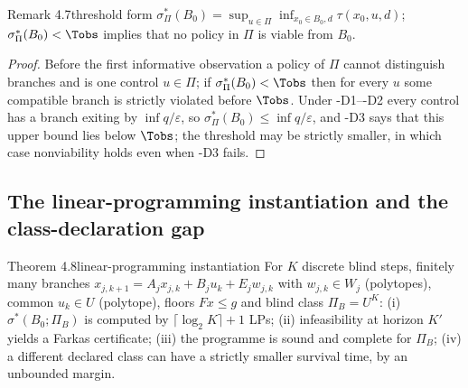 \begin{restated}{Remark 4.7}{threshold form}
$\sigma^*_\Pi(B_0)=\sup_{u\in\Pi}\inf_{x_0\in B_0,d}\tau(x_0,u,d)$; $\sigma^*_\Pi(B_0)<\Tobs$ implies that no policy in $\Pi$ is viable from $B_0$.
\end{restated}

\begin{proof}
Before the first informative observation a policy of $\Pi$ cannot distinguish branches and is one control $u\in\Pi$; if $\sigma^*_\Pi(B_0)<\Tobs$ then for every $u$ some compatible branch is strictly violated before $\Tobs$. Under \hyp{D1}--\hyp{D2} every control has a branch exiting by $\inf q/\varepsilon$, so $\sigma^*_\Pi(B_0)\le\inf q/\varepsilon$, and \hyp{D3} says that this upper bound lies below $\Tobs$; the threshold may be strictly smaller, in which case nonviability holds even when \hyp{D3} fails.
\end{proof}

\subsection{The linear-programming instantiation and the class-declaration gap}\label{S:lp}

\begin{restated}{Theorem 4.8}{linear-programming instantiation}
For $K$ discrete blind steps, finitely many branches $x_{j,k+1}=A_jx_{j,k}+B_ju_k+E_jw_{j,k}$ with $w_{j,k}\in W_j$ (polytopes), common $u_k\in U$ (polytope), floors $Fx\le g$ and blind class $\Pi_B=U^K$: (i) $\sigma^*(B_0;\Pi_B)$ is computed by $\lceil\log_2K\rceil+1$ LPs; (ii) infeasibility at horizon $K'$ yields a Farkas certificate; (iii) the programme is sound and complete for $\Pi_B$; (iv) a different declared class can have a strictly smaller survival time, by an unbounded margin.
\end{restated}

